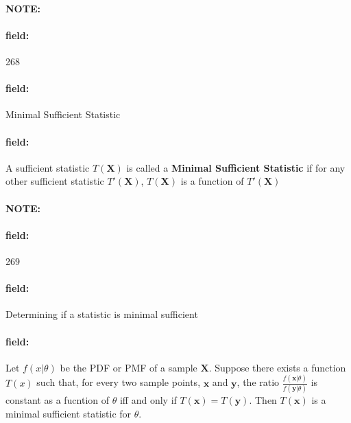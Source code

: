 \documentclass[12pt]{article}
\newenvironment{note}{\paragraph{NOTE:}}{}
\newenvironment{field}{\paragraph{field:}}{}
\begin{document}
\begin{note} \begin{field} \tiny 268 \end{field}
  \begin{field}
    Minimal Sufficient Statistic
  \end{field}
  \begin{field}
    A sufficient statistic $T(\mathbf{X})$ is called a \textbf{Minimal Sufficient Statistic} if for any other sufficient statistic $T'(\mathbf{X})$, $T(\mathbf{X})$ is a function of $T'(\mathbf{X})$
  \end{field}
\end{note}

\begin{note} \begin{field} \tiny 269 \end{field}
  \begin{field}
    Determining if a statistic is minimal sufficient
  \end{field}
  \begin{field}
    Let $f(x|\theta)$ be the PDF or PMF of a sample $\mathbf{X}$. Suppose there exists a function $T(x)$ such that, for every two sample points, $\mathbf{x}$ and $\mathbf{y}$, the ratio $\frac{f(\mathbf{x}|\theta)}{f(\mathbf{y}|\theta)}$ is constant as a fucntion of $\theta$ iff and only if $T(\mathbf{x}) = T(\mathbf{y})$. Then $T(\mathbf{x})$ is a minimal sufficient statistic for $\theta$.
  \end{field}
\end{note}
\end{document}
